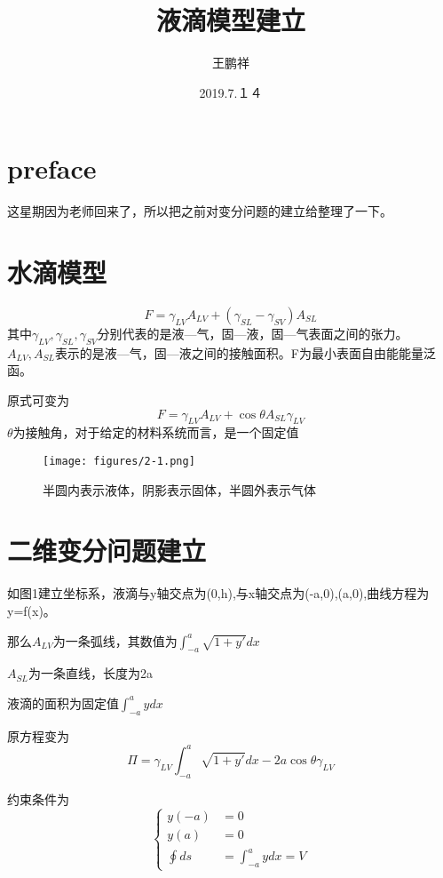 \documentclass{article}
\begin{document}
\title{液滴模型建立}
\author{王鹏祥}
\date{2019.7.１４}
\maketitle

		\section{preface}
		这星期因为老师回来了，所以把之前对变分问题的建立给整理了一下。
		\section{水滴模型}
		\begin{equation*}
		F=\gamma_{LV} A_{LV}+(\gamma_{SL}-\gamma_{SV})A_{SL}
		\end{equation*}
		其中$\gamma_{LV}, \gamma_{SL},\gamma_{SV}$分别代表的是液—气，固—液，固—气表面之间的张力。 $A_{LV},A_{SL}$表示的是液—气，固—液之间的接触面积。F为最小表面自由能能量泛函。
        
        原式可变为
        \begin{equation*}
        F=\gamma_{LV} A_{LV}+\cos \theta A_{SL}\gamma_{LV}
        \end{equation*}
        $\theta$为接触角，对于给定的材料系统而言，是一个固定值
\begin{figure}[H]
	\centering
	\texttt{[image: figures/2-1.png]}
	\caption{半圆内表示液体，阴影表示固体，半圆外表示气体}
\end{figure}

\section{二维变分问题建立}
如图1建立坐标系，液滴与y轴交点为(0,h),与x轴交点为(-a,0),(a,0),曲线方程为y=f(x)。

那么$A_{LV}$为一条弧线，其数值为$\int^{a}_{-a} \sqrt{1+y'}dx$

$A_{SL}$为一条直线，长度为2a

液滴的面积为固定值$\int_{-a}^{a}ydx$

原方程变为
\begin{equation*}
\varPi=\gamma_{LV} \int^{a}_{-a} \sqrt{1+y'}dx - 2a\cos \theta \gamma_{LV}
\end{equation*}

约束条件为
\begin{equation*}
\left\{
\begin{aligned}
y(-a)    & =  0 \\
y(a)     & =  0 \\
\oint ds & =  \int_{-a}^{a}ydx = V
\end{aligned}
\right.
\end{equation*}
\end{document}
